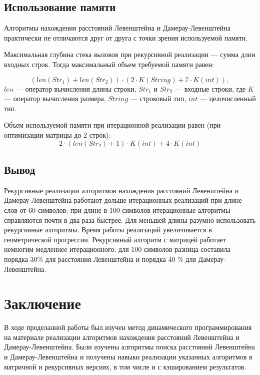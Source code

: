\documentclass[12pt]{report}
\begin{document}
    \section{Использование памяти}
    Алгоритмы нахождения расстояний Левенштейна и Дамерау-Левенштейна практически
    не отличаются друг от друга с точки зрения используемой памяти.

    Максимальная глубина стека вызовов при рекурсивной реализации --- сумма длин входных строк.
    Тогда максимальный объем требуемой памяти равен:

    \begin{equation}
        (len(Str_{1}) + len(Str_{2})) \cdot
        (2 \cdot K(String) + 7 \cdot K(int)),
    \end{equation}
    $len$ --- оператор вычисления длины строки,
    $Str_{1}$ и $Str_{2}$ --- входные строки,
    где $K$ --- оператор вычисления размера,
    $String$ --- строковый тип, $int$ --- целочисленный тип.

    Объем используемой памяти при итерационной реализации равен (при оптимизации матрицы до 2 строк):
    \begin{equation}
        2 \cdot (len(Str_{2}) + 1) \cdot K(int) +
        4 \cdot K(int)
    \end{equation}


    \section{Вывод}
    Рекурсивные реализации алгоритмов нахождения расстояний Левенштейна и Дамерау-Левенштейна
    работают дольше итерационных реализаций при длине слов от 60 символов: при длине в 100 символов итерационные
    алгоритмы справляются почти в два раза быстрее. Для меньшей длины разумно использовать рекурсивные алгоритмы.
    Время работы реализаций увеличивается в геометрической прогрессии.
    Рекурсивный алгоритм с матрицей работает немногим медленнее итерационного: для 100 символов разница составила
    порядка 30\% для расстояния Левенштейна и порядка 40 \% для Дамерау-Левенштейна.
    \chapter*{Заключение}
    В ходе проделанной работы был изучен метод динамического программирования на материале реализации
    алгоритмов нахождения расстояний Левенштейна и Дамерау-Левенштейна.
    Были изучены алгоритмы поиска расстояний Левенштейна и Дамерау-Левенштейна и получены навыки
    реализации указанных алгоритмов в матричной и рекурсивных версиях, в том числе и с кэшированием результатов.
\end{document}
